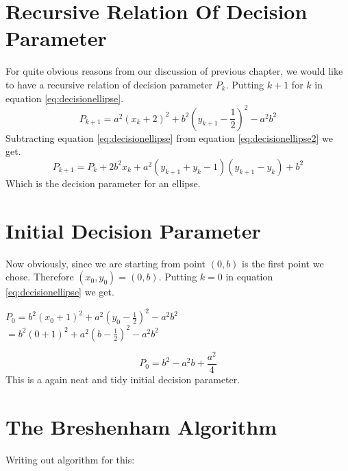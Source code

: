 \documentclass[a4paper,12pt,oneside]{book}
\begin{document}
\section{Recursive Relation Of Decision Parameter}
For quite obvious reasons from our discussion of previous chapter, we would like to have a recursive relation of decision parameter $P_k$. Putting $k+1$ for $k$ in equation \ref{eq:decisionellipse}.
\begin{equation} \label{eq:decisionellipse2}
	P_{k+1}=a^2(x_k+2)^2+b^2(y_{k+1}-\frac{1}{2})^2-a^2b^2
\end{equation}
Subtracting equation \ref{eq:decisionellipse} from equation \ref{eq:decisionellipse2} we get.
\begin{equation} \label{eq:ellipserecursivep}
	P_{k+1}=P_k+2b^2x_k+a^2(y_{k+1}+y_k-1)(y_{k+1}-y_k)+b^2
\end{equation}
 Which is the decision parameter for an ellipse.
 \section{Initial Decision Parameter}
 Now obviously, since we are starting from point  $(0,b)$ is the first point we chose. Therefore $(x_0,y_0)=(0,b)$. Putting $k=0$ in equation \ref{eq:decisionellipse} we get.
 \begin{center}
 	$P_0=b^2(x_0+1)^2+a^2(y_0-\frac{1}{2})^2-a^2b^2$\\
	$=b^2(0+1)^2+a^2(b-\frac{1}{2})^2-a^2b^2$ 	
 \end{center}
 \begin{equation} \label{eq:p0ellipse}
	P_0=b^2-a^2b+\frac{a^2}{4}
 \end{equation}
 This is a again neat and tidy initial decision parameter.\\

 \section{The Breshenham Algorithm}
Writing out algorithm for this:
\end{document}
